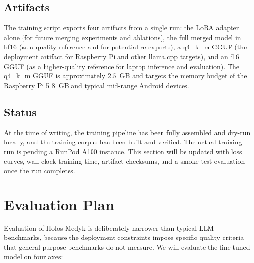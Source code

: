\documentclass{article}
\theoremstyle{plain}
\theoremstyle{definition}
\theoremstyle{remark}
\begin{document}
\subsection{Artifacts}

The training script exports four artifacts from a single run: the LoRA adapter alone (for future merging experiments and ablations), the full merged model in bf16 (as a quality reference and for potential re-exports), a q4\_k\_m GGUF (the deployment artifact for Raspberry Pi and other llama.cpp targets), and an f16 GGUF (as a higher-quality reference for laptop inference and evaluation). The q4\_k\_m GGUF is approximately 2.5~GB and targets the memory budget of the Raspberry Pi 5 8~GB and typical mid-range Android devices.

\subsection{Status}

At the time of writing, the training pipeline has been fully assembled and dry-run locally, and the training corpus has been built and verified. The actual training run is pending a RunPod A100 instance. This section will be updated with loss curves, wall-clock training time, artifact checksums, and a smoke-test evaluation once the run completes.

\section{Evaluation Plan}

Evaluation of Holos Medyk is deliberately narrower than typical LLM benchmarks, because the deployment constraints impose specific quality criteria that general-purpose benchmarks do not measure. We will evaluate the fine-tuned model on four axes:
\end{document}
